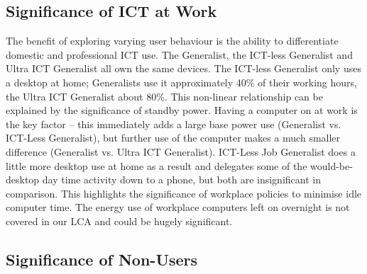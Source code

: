 \documentclass[conference]{IEEEtran}
\begin{document}


\subsection{Significance of ICT at Work}

The benefit of exploring varying user behaviour is the ability to
differentiate domestic and professional ICT use. The Generalist, the
ICT-less Generalist and Ultra ICT Generalist all own the same
devices. The ICT-less Generalist only uses a desktop at home;
Generalists use it approximately 40\% of their working hours, the
Ultra ICT Generalist about 80\%.  This non-linear relationship can be
explained by the significance of standby power. Having a computer on
at work is the key factor -- this immediately adds a large base power
use (Generalist vs. ICT-Less Generalist), but further use of the
computer makes a much smaller difference (Generalist vs. Ultra ICT
Generalist). ICT-Less Job Generalist does a little more desktop use at
home as a result and delegates some of the would-be-desktop day time
activity down to a phone, but both are insignificant in
comparison. This highlights the significance of workplace policies to
minimise idle computer time. The energy use of workplace computers
left on overnight is not covered in our LCA and could be hugely
significant.



\subsection{Significance of Non-Users}
\end{document}

